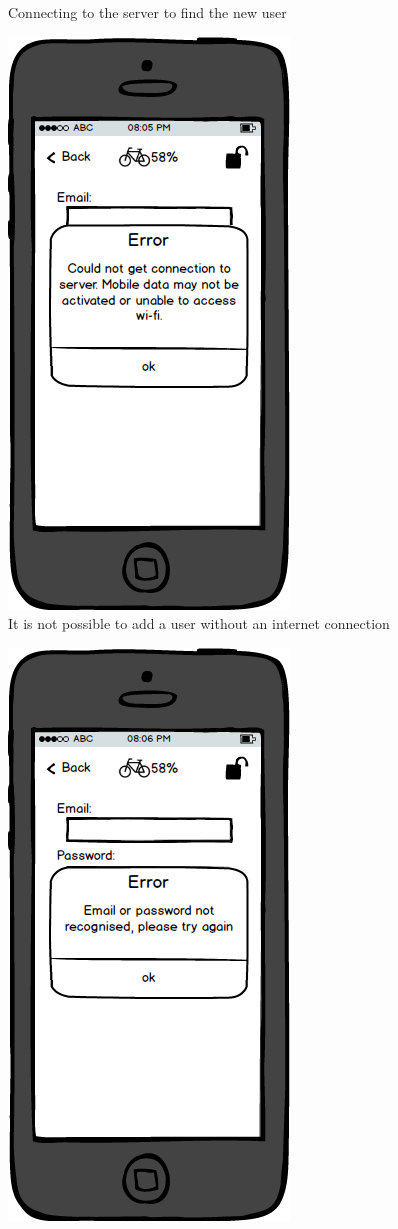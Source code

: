 \documentclass[a4paper]{report}
\begin{document}
{\begin{figure}
\caption{Connecting to the server to find the new user}
\end{figure}
\clearpage
\begin{figure}
\centering
\includegraphics[scale=0.9]{figures/prototype_2/add_user_err_conn}
\caption{It is not possible to add a user without an internet connection}
\end{figure}
\clearpage\begin{figure}
\centering
\includegraphics[scale=0.9]{figures/prototype_2/add_user_unrecognised}

\end{figure}}
\end{document}
